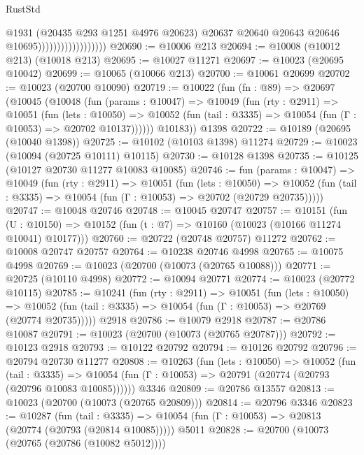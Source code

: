 \begin{lexlean}{RustStd}
\begin{coremodule}
                                        @1931
                                        (@20435 @293 @1251 @4976 @20623)
                                        @20637
                                        @20640
                                        @20643
                                        @20646
                                        @10695))))))))))))))))))
@20690 := @10006 @213
@20694 := @10008 (@10012 @213) (@10018 @213)
@20695 := @10027 @11271
@20697 := @10023 (@20695 @10042)
@20699 := @10065 (@10066 @213)
@20700 := @10061 @20699
@20702 := @10023 (@20700 @10090)
@20719 := @10022
    (fun (fn : @89) =>
    @20697
      (@10045
        (@10048
          (fun (params : @10047) =>
          @10049
            (fun (rty : @2911) =>
            @10051
              (fun (lets : @10050) =>
              @10052 (fun (tail : @3335) => @10054 (fun (Γ : @10053) => @20702 @10137))))))
        @10183))
    @1398
@20722 := @10189 (@20695 (@10040 @1398))
@20725 := @10102 (@10103 @1398) @11274
@20729 := @10023 (@10094 (@20725 @10111) @10115)
@20730 := @10128 @1398
@20735 := @10125 (@10127 @20730 @11277 @10083 @10085)
@20746 := fun (params : @10047) =>
  @10049
    (fun (rty : @2911) =>
    @10051
      (fun (lets : @10050) =>
      @10052 (fun (tail : @3335) => @10054 (fun (Γ : @10053) => @20702 (@20729 @20735)))))
@20747 := @10048 @20746
@20748 := @10045 @20747
@20757 := @10151
    (fun (U : @10150) => @10152 (fun (t : @7) => @10160 (@10023 (@10166 @11274 @10041) @10177)))
@20760 := @20722 (@20748 @20757) @11272
@20762 := @10008 @20747 @20757
@20764 := @10238 @20746 @4998
@20765 := @10075 @4998
@20769 := @10023 (@20700 (@10073 (@20765 @10088)))
@20771 := @20725 (@10110 @4998)
@20772 := @10094 @20771
@20774 := @10023 (@20772 @10115)
@20785 := @10241
    (fun (rty : @2911) =>
    @10051
      (fun (lets : @10050) =>
      @10052 (fun (tail : @3335) => @10054 (fun (Γ : @10053) => @20769 (@20774 @20735)))))
    @2918
@20786 := @10079 @2918
@20787 := @20786 @10087
@20791 := @10023 (@20700 (@10073 (@20765 @20787)))
@20792 := @10123 @2918
@20793 := @10122 @20792
@20794 := @10126 @20792
@20796 := @20794 @20730 @11277
@20808 := @10263
    (fun (lets : @10050) =>
    @10052
      (fun (tail : @3335) =>
      @10054 (fun (Γ : @10053) => @20791 (@20774 (@20793 (@20796 @10083 @10085))))))
    @3346
@20809 := @20786 @13557
@20813 := @10023 (@20700 (@10073 (@20765 @20809)))
@20814 := @20796 @3346
@20823 := @10287
    (fun (tail : @3335) => @10054 (fun (Γ : @10053) => @20813 (@20774 (@20793 (@20814 @10085)))))
    @5011
@20828 := @20700 (@10073 (@20765 (@20786 (@10082 @5012))))

\end{coremodule}
\end{lexlean}
